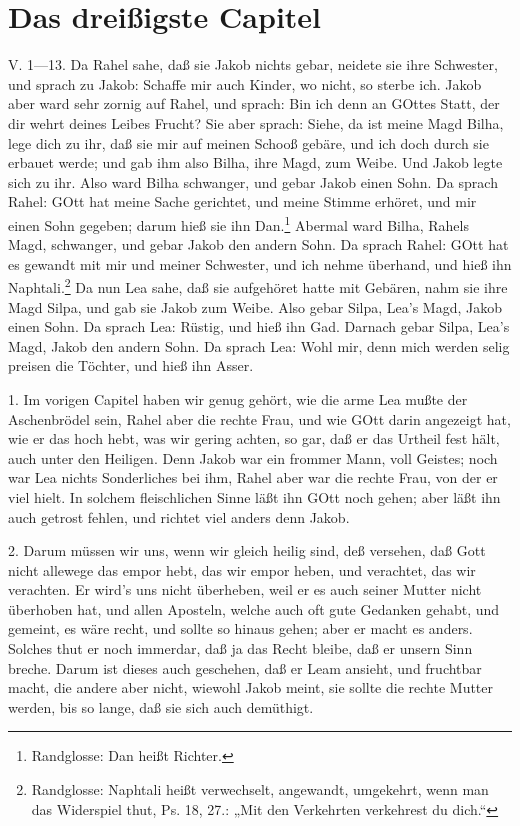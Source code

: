 \section{Das dreißigste Capitel}
\begin{schriftzitat}
V. 1—13. Da Rahel sahe, daß sie Jakob nichts gebar, neidete sie ihre Schwester, und sprach zu Jakob: Schaffe mir auch Kinder, wo nicht, so sterbe ich. Jakob aber ward sehr zornig auf Rahel, und sprach: Bin ich denn an GOttes Statt, der dir wehrt deines Leibes Frucht? Sie aber sprach: Siehe, da ist meine Magd Bilha, lege dich zu ihr, daß sie mir auf meinen Schooß gebäre, und ich doch durch sie erbauet werde; und gab ihm also Bilha, ihre Magd, zum Weibe. Und Jakob legte sich zu ihr. Also ward Bilha schwanger, und gebar Jakob einen Sohn. Da sprach Rahel: GOtt hat meine Sache gerichtet, und meine Stimme erhöret, und mir einen Sohn gegeben; darum hieß sie ihn Dan.\footnote{Randglosse: Dan heißt Richter.} Abermal ward Bilha, Rahels Magd, schwanger, und gebar Jakob den andern Sohn. Da sprach Rahel: GOtt hat es gewandt mit mir und meiner Schwester, und ich nehme überhand, und hieß ihn Naphtali.\footnote{Randglosse: Naphtali heißt verwechselt, angewandt, umgekehrt, wenn man das Widerspiel thut, Ps. 18, 27.: „Mit den Verkehrten verkehrest du dich.“} Da nun Lea sahe, daß sie aufgehöret hatte mit Gebären, nahm sie ihre Magd Silpa, und gab sie Jakob zum Weibe. Also gebar Silpa, Lea’s Magd, Jakob einen Sohn. Da sprach Lea: Rüstig, und hieß ihn Gad. Darnach gebar Silpa, Lea’s Magd, Jakob den andern Sohn. Da sprach Lea: Wohl mir, denn mich werden selig preisen die Töchter, und hieß ihn Asser.
\end{schriftzitat}

1. Im vorigen Capitel haben wir genug gehört, wie die arme Lea mußte der Aschenbrödel sein, Rahel aber die rechte Frau, und wie GOtt darin angezeigt hat, wie er das hoch hebt, was wir gering achten, so gar, daß er das Urtheil fest hält, auch unter den Heiligen. Denn Jakob war ein frommer Mann, voll Geistes; noch war Lea nichts Sonderliches bei ihm, Rahel aber war die rechte Frau, von der er viel hielt. In solchem fleischlichen Sinne läßt ihn GOtt noch gehen; aber läßt ihn auch getrost fehlen, und richtet viel anders denn Jakob.

2. Darum müssen wir uns, wenn wir gleich heilig sind, deß versehen, daß Gott nicht allewege das empor hebt, das wir empor heben, und verachtet, das wir verachten. Er wird’s uns nicht überheben, weil er es auch seiner Mutter nicht überhoben hat, und allen Aposteln, welche auch oft gute Gedanken gehabt, und gemeint, es wäre recht, und sollte so hinaus gehen; aber er macht es anders. Solches thut er noch immerdar, daß ja das Recht bleibe, daß er unsern Sinn breche. Darum ist dieses auch geschehen, daß er Leam ansieht, und fruchtbar macht, die andere aber nicht, wiewohl Jakob meint, sie sollte die rechte Mutter werden, bis so lange, daß sie sich auch demüthigt.

